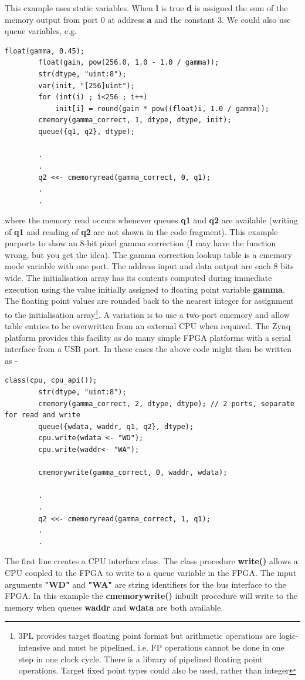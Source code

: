 \documentclass[10pt,a4paper,twoside,fleqn]{article}
\newcommand{\kwd}[1]{{\bf #1}} %
\newcommand{\var}[1]{{\bf #1}} %
\begin{document}
    This example uses static variables. When \var{l} is true \var{d} is
    assigned the sum of the memory output from port 0 at address \var{a} and
    the constant 3. We could also use queue variables, e.g.
    \begin{lstlisting}[language=threepl]
        float(gamma, 0.45);
        float(gain, pow(256.0, 1.0 - 1.0 / gamma));
        str(dtype, "uint:8");
        var(init, "[256]uint");
        for (int(i) ; i<256 ; i++)
            init[i] = round(gain * pow((float)i, 1.0 / gamma));
        cmemory(gamma_correct, 1, dtype, dtype, init);
        queue({q1, q2}, dtype);
        
        .
        .
        q2 <<- cmemoryread(gamma_correct, 0, q1);
        .
        .
    \end{lstlisting}
    where the memory read occurs whenever queues \var{q1} and \var{q2} are
    available (writing of \var{q1} and reading of \var{q2} are not shown in
    the code fragment). This example purports to show an 8-bit pixel gamma
    correction (I may have the function wrong, but you get the idea). The
    gamma correction lookup table is a cmemory mode variable with one port.
    The address input and data output are each 8 bits wide. The initialisation
    array has its contents computed during immediate execution using the
    value initially assigned to floating point variable \var{gamma}. The
    floating point values are rounded back to the nearest integer for
    assignment to the initialisation array\footnote{3PL provides
    target floating point format but arithmetic operations are logic-intensive and
    must be pipelined, i.e. FP operations cannot be done in one step in one
    clock cycle. There is a library of pipelined floating point operations.
    Target fixed point types could also be used, rather than integer}.
    A variation is to use a two-port cmemory and allow table entries to be
    overwritten from an external CPU when required. The Zynq platform
    provides this facility as do many simple FPGA platforms with a serial
    interface from a USB port. In these cases the above code might then be
    written as -
    \begin{lstlisting}[language=threepl]
        class(cpu, cpu_api());
        str(dtype, "uint:8");
        cmemory(gamma_correct, 2, dtype, dtype); // 2 ports, separate for read and write
        queue({wdata, waddr, q1, q2}, dtype);
        cpu.write(wdata <- "WD");
        cpu.write(waddr<- "WA");
        
        cmemorywrite(gamma_correct, 0, waddr, wdata);
        
        .
        .
        q2 <<- cmemoryread(gamma_correct, 1, q1);
        .
        .
    \end{lstlisting}
    The first line creates a CPU interface class.
    The class procedure \kwd{write()} allows a CPU coupled to the FPGA
    to write to a queue variable in the FPGA. The input arguments \var{"WD"} and
    \var{"WA"} are string identifiers for the bus interface to the FPGA.
    In this example the \kwd{cmemorywrite()} inbuilt procedure will write to the
    memory when queues \kwd{waddr} and \kwd{wdata} are both available.
\end{document}
